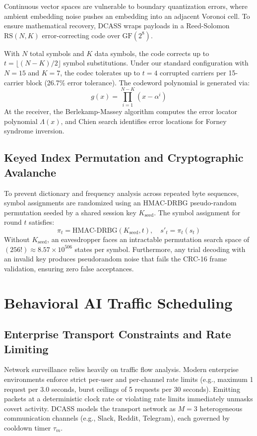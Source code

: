 \documentclass[conference]{IEEEtran}
\begin{document}
Continuous vector spaces are vulnerable to boundary quantization errors, where ambient embedding noise pushes an embedding into an adjacent Voronoi cell. To ensure mathematical recovery, DCASS wraps payloads in a Reed-Solomon $\text{RS}(N, K)$ error-correcting code over $\text{GF}(2^8)$.

With $N$ total symbols and $K$ data symbols, the code corrects up to $t = \lfloor (N - K) / 2 \rfloor$ symbol substitutions. Under our standard configuration with $N = 15$ and $K = 7$, the codec tolerates up to $t = 4$ corrupted carriers per 15-carrier block (26.7\% error tolerance). The codeword polynomial is generated via:
\begin{equation}
g(x) = \prod_{i=1}^{N-K} (x - \alpha^i)
\end{equation}
At the receiver, the Berlekamp-Massey algorithm computes the error locator polynomial $\Lambda(x)$, and Chien search identifies error locations for Forney syndrome inversion.

\subsection{Keyed Index Permutation and Cryptographic Avalanche}

To prevent dictionary and frequency analysis across repeated byte sequences, symbol assignments are randomized using an HMAC-DRBG pseudo-random permutation seeded by a shared session key $K_{\text{seed}}$. The symbol assignment for round $t$ satisfies:
\begin{equation}
\pi_t = \text{HMAC-DRBG}(K_{\text{seed}}, t), \quad s'_t = \pi_t(s_t)
\end{equation}
Without $K_{\text{seed}}$, an eavesdropper faces an intractable permutation search space of $(256!) \approx 8.57 \times 10^{506}$ states per symbol. Furthermore, any trial decoding with an invalid key produces pseudorandom noise that fails the CRC-16 frame validation, ensuring zero false acceptances.

\section{Behavioral AI Traffic Scheduling}

\subsection{Enterprise Transport Constraints and Rate Limiting}

Network surveillance relies heavily on traffic flow analysis. Modern enterprise environments enforce strict per-user and per-channel rate limits (e.g., maximum 1 request per 3.0 seconds, burst ceilings of 5 requests per 30 seconds). Emitting packets at a deterministic clock rate or violating rate limits immediately unmasks covert activity. DCASS models the transport network as $M = 3$ heterogeneous communication channels (e.g., Slack, Reddit, Telegram), each governed by cooldown timer $\tau_m$.
\end{document}
